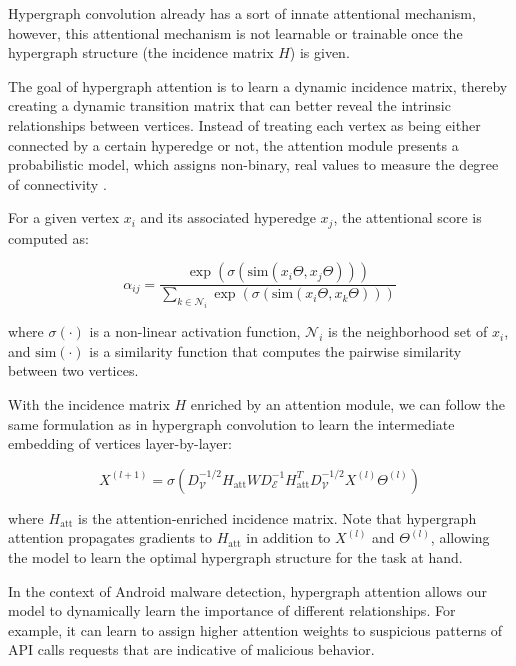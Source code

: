 \documentclass[runningheads]{llncs}
\begin{document}
Hypergraph convolution already has a sort of innate attentional mechanism, however, this attentional mechanism is not learnable or trainable once the hypergraph structure (the incidence matrix $H$) is given.

The goal of hypergraph attention is to learn a dynamic incidence matrix, thereby creating a dynamic transition matrix that can better reveal the intrinsic relationships between vertices. Instead of treating each vertex as being either connected by a certain hyperedge or not, the attention module presents a probabilistic model, which assigns non-binary, real values to measure the degree of connectivity \cite{bai2021}.

For a given vertex $x_i$ and its associated hyperedge $x_j$, the attentional score is computed as:

\begin{equation}
\alpha_{ij} = \frac{\exp(\sigma(\text{sim}(x_i\Theta, x_j\Theta)))}{\sum_{k \in \mathcal{N}_i} \exp(\sigma(\text{sim}(x_i\Theta, x_k\Theta)))}
\end{equation}

where $\sigma(\cdot)$ is a non-linear activation function, $\mathcal{N}_i$ is the neighborhood set of $x_i$, and $\text{sim}(\cdot)$ is a similarity function that computes the pairwise similarity between two vertices.



With the incidence matrix $H$ enriched by an attention module, we can follow the same formulation as in hypergraph convolution to learn the intermediate embedding of vertices layer-by-layer:

\begin{equation}
X^{(l+1)} = \sigma(D_{\mathcal{V}}^{-1/2} H_{\text{att}} W D_{\mathcal{E}}^{-1} H_{\text{att}}^T D_{\mathcal{V}}^{-1/2} X^{(l)} \Theta^{(l)})
\end{equation}

where $H_{\text{att}}$ is the attention-enriched incidence matrix. Note that hypergraph attention propagates gradients to $H_{\text{att}}$ in addition to $X^{(l)}$ and $\Theta^{(l)}$, allowing the model to learn the optimal hypergraph structure for the task at hand.



In the context of Android malware detection, hypergraph attention allows our model to dynamically learn the importance of different relationships. For example, it can learn to assign higher attention weights to suspicious patterns of API calls requests that are indicative of malicious behavior. 
\end{document}
